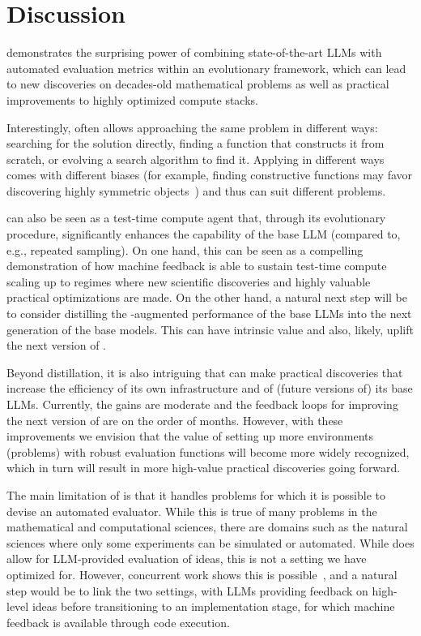 \section{Discussion}
\label{sec:discussion}

\method demonstrates the surprising power of combining state-of-the-art LLMs with automated evaluation metrics within an evolutionary framework, which can lead to new discoveries on decades-old mathematical problems as well as practical improvements to highly optimized compute stacks.

Interestingly, \method often allows approaching the same problem in different ways: searching for the solution directly, finding a function that constructs it from scratch, or evolving a search algorithm to find it.
Applying \method in different ways  comes with different biases (for example, finding constructive functions may favor discovering highly symmetric objects~\cite{paredes2023mathematical}) and thus can suit different problems.

\method can also be seen as a test-time compute agent that, through its evolutionary procedure, significantly enhances the capability of the base LLM (compared to, e.g., repeated sampling).
On one hand, this can be seen as a compelling demonstration of how machine feedback is able to sustain test-time compute scaling up to regimes where new scientific discoveries and highly valuable practical optimizations are made.
On the other hand, a natural next step will be to consider distilling the \method-augmented performance of the base LLMs into the next generation of the base models.
This can have intrinsic value and also, likely, uplift the next version of \method.

Beyond distillation, it is also intriguing that \method can make practical discoveries that increase the efficiency of its own infrastructure and of (future versions of) its base LLMs.
Currently, the gains are moderate and the feedback loops for improving the next version of \method are on the order of months.
However, with these improvements we envision that the value of setting up more environments (problems) with robust evaluation functions will become more widely recognized, which in turn will result in more high-value practical discoveries going forward.

The main limitation of \method is that it handles problems for which it is possible to devise an automated evaluator.
While this is true of many problems in the mathematical and computational sciences, there are domains such as the natural sciences where only some experiments can be simulated or automated.
While \method does allow for LLM-provided evaluation of ideas, this is not a setting we have optimized for.
However, concurrent work shows this is possible~\cite{gottweis2025towards}, and a natural step would be to link the two settings, with LLMs providing feedback on high-level ideas before transitioning to an implementation stage, for which machine feedback is available through code execution.
